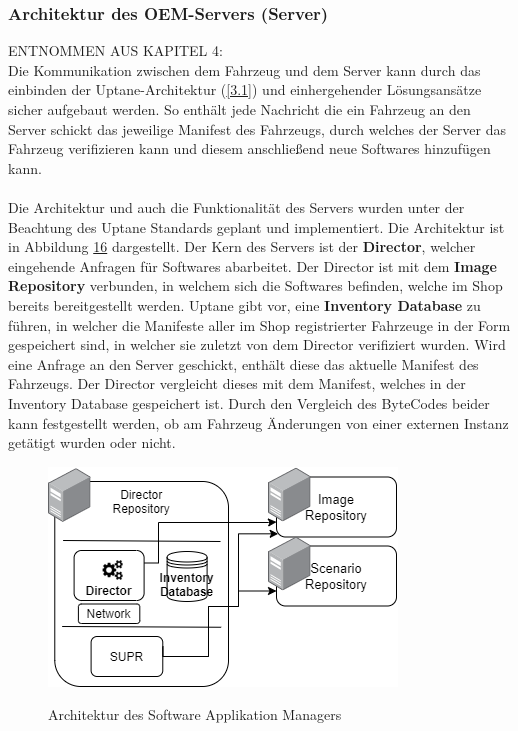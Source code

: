\subsubsection{Architektur des OEM-Servers (Server)}
ENTNOMMEN AUS KAPITEL 4: \\
Die Kommunikation zwischen dem Fahrzeug und dem Server kann durch das einbinden der Uptane-Architektur (\ref{3.1}) und einhergehender Lösungsansätze sicher aufgebaut werden. So enthält jede Nachricht die ein Fahrzeug an den Server schickt das jeweilige Manifest des Fahrzeugs, durch welches der Server das Fahrzeug verifizieren kann und diesem anschließend neue Softwares hinzufügen kann.\\\\
Die Architektur und auch die Funktionalität des Servers wurden unter der Beachtung des Uptane Standards geplant und implementiert. Die Architektur ist in Abbildung \hyperref[img:server]{16} dargestellt. Der Kern des Servers ist der \textbf{Director}, welcher eingehende Anfragen für Softwares abarbeitet. Der Director ist mit dem\textbf{ Image Repository} verbunden, in welchem sich die Softwares befinden, welche im Shop bereits bereitgestellt werden. Uptane gibt vor, eine \textbf{Inventory Database} zu führen, in welcher die Manifeste aller im Shop registrierter Fahrzeuge in der Form gespeichert sind, in welcher sie zuletzt von dem Director verifiziert wurden. Wird eine Anfrage an den Server geschickt, enthält diese das aktuelle Manifest des Fahrzeugs. Der Director vergleicht dieses mit dem Manifest, welches in der Inventory Database gespeichert ist. Durch den Vergleich des ByteCodes beider kann festgestellt werden, ob am Fahrzeug Änderungen von einer externen Instanz getätigt wurden oder nicht.
\begin{figure}[!h]
	\centering
	\includegraphics[width=0.75\columnwidth]{pictures/konzept-OEM-vs.png}
	\label{img:server}
	\caption{Architektur des Software Applikation Managers}
\end{figure}

